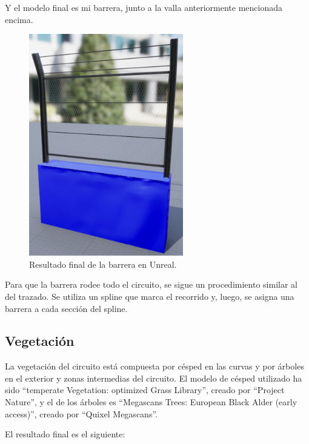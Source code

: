 Y el modelo final es mi barrera, junto a la valla anteriormente mencionada encima.

\begin{figure}[H]
    \centering
    \includegraphics[width=0.6\textwidth]{imagenes/converted/barrier/barrierfence.jpg}
    \caption{Resultado final de la barrera en Unreal.}
    \label{fig:barreraFinal}
\end{figure}

Para que la barrera rodee todo el circuito, se sigue un procedimiento similar al del trazado. Se utiliza un spline que marca el recorrido y, luego, se asigna una barrera a cada sección del spline.

\newpage

\subsection{Vegetación}

La vegetación del circuito está compuesta por césped en las curvas y por árboles en el exterior y zonas intermedias del circuito. El modelo de césped utilizado ha sido ``temperate Vegetation: optimized Grass Library''\cite{grass}, creado por ``Project Nature'', y el de los árboles es ``Megascans Trees: European Black Alder (early access)''\cite{trees}, creado por ``Quixel Megascans''.

\bigskip

El resultado final es el siguiente:

